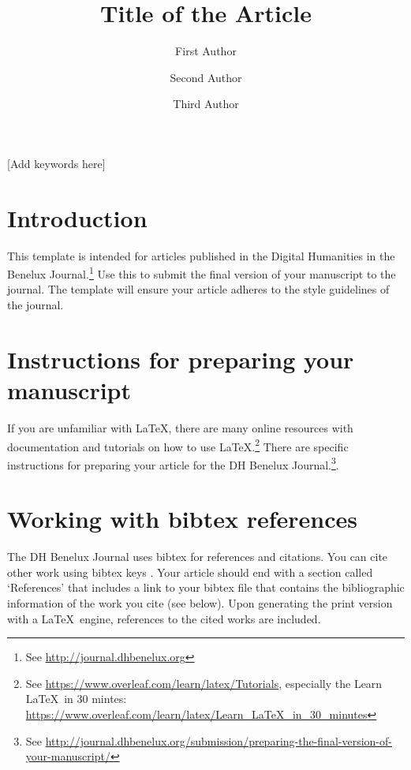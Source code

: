 \documentclass{dhbenelux}
\author[1]{First Author}
\author[2]{Second Author}
\author[2]{Third Author}
\affil[1]{First author's affiliation}
\affil[2]{Second and third authors' affiliation}
\title{Title of the Article}
\begin{document}
\maketitle
\copyrightstatement

\begin{abstract}
\end{abstract}

\begin{keywords}
    {[Add keywords here]}
\end{keywords}
\section{Introduction}

This template is intended for articles published in the Digital Humanities in the Benelux Journal.\footnote{See \url{http://journal.dhbenelux.org}} Use this to submit the final version of your manuscript to the journal. The template will ensure your article adheres to the style guidelines of the journal. 

\section{Instructions for preparing your manuscript}

If you are unfamiliar with \LaTeX, there are many online resources with documentation and tutorials on how to use \LaTeX.\footnote{See \url{https://www.overleaf.com/learn/latex/Tutorials}, especially the Learn \LaTeX\ in 30 mintes: \url{https://www.overleaf.com/learn/latex/Learn_LaTeX_in_30_minutes}} 
%
There are specific instructions for preparing your article for the DH Benelux Journal.\footnote{See \url{http://journal.dhbenelux.org/submission/preparing-the-final-version-of-your-manuscript/}}.


\section{Working with bibtex references}

The DH Benelux Journal uses bibtex for references and citations. You can cite other work using bibtex keys \citet{maxwell2013qualitative}. Your article should end with a section called `References' that includes a link to your bibtex file that contains the bibliographic information of the work you cite (see below). Upon generating the print version with a \LaTeX\ engine, references to the cited works are included. 
\end{document}
